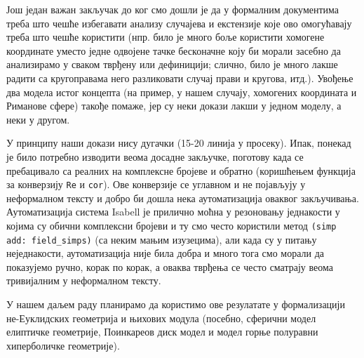 Још један важан закључак до ког смо дошли је да у формалним
документима треба што чешће избегавати анализу случајева и екстензије
које ово омогућавају треба што чешће користити (нпр. било је много
боље користити хомогене координате уместо једне одвојене тачке
бесконачне коју би морали засебно да анализирамо у сваком тврђену или
дефиницији; слично, било је много лакше радити са кругоправама него
разликовати случај прави и кругова, итд.). Увођење два модела истог
концепта (на пример, у нашем случају, хомогених координата и Риманове
сфере) такође помаже, јер су неки докази лакши у једном моделу, а неки
у другом.

У принципу наши докази нису дугачки (15-20 линија у просеку). Ипак,
понекад је било потребно изводити веома досадне закључке, поготову
када се пребацивало са реалних на комплексне бројеве и обратно
(коришћењем функција за конверзију {\tt Re} и {\tt cor}). Ове
конверзије се углавном и не појављују у неформалном тексту и добро би
дошла нека аутоматизација оваквог закључивања. Аутоматизација система
Isabell је прилично моћна у резоновању једнакости у којима су обични
комплексни бројеви и ту смо често користили метод {\tt (simp add:
  field\_simps)} (са неким мањим изузецима), али када су у питању
неједнакости, аутоматизација није била добра и много тога смо морали
да показујемо ручно, корак по корак, а оваква тврђења се често
сматрају веома тривијалним у неформалном тексту.

У нашем даљем раду планирамо да користимо ове резулатате у
формализацији не-Еуклидских геометрија и њихових модула (посебно,
сферични модел елиптичке геометрије, Поинкареов диск модел и модел
горње полуравни хиперболичке геометрије).







